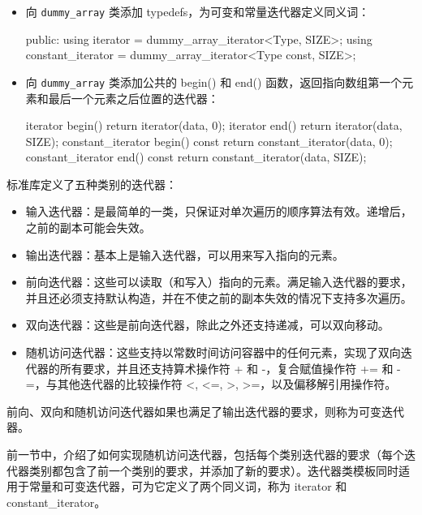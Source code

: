 \begin{itemize}
\item
向 \verb|dummy_array| 类添加 typedefs，为可变和常量迭代器定义同义词：

\begin{cpp}
public:
    using iterator = dummy_array_iterator<Type, SIZE>;
    using constant_iterator = dummy_array_iterator<Type const,
                                                   SIZE>;
\end{cpp}

\item
向 \verb|dummy_array| 类添加公共的 begin() 和 end() 函数，返回指向数组第一个元素和最后一个元素之后位置的迭代器：

\begin{cpp}
iterator begin()
{
    return iterator(data, 0);
}
iterator end()
{
    return iterator(data, SIZE);
}
constant_iterator begin() const
{
    return constant_iterator(data, 0);
}
constant_iterator end() const
{
    return constant_iterator(data, SIZE);
}
\end{cpp}
\end{itemize}


标准库定义了五种类别的迭代器：

\begin{itemize}
\item
输入迭代器：是最简单的一类，只保证对单次遍历的顺序算法有效。递增后，之前的副本可能会失效。

\item
输出迭代器：基本上是输入迭代器，可以用来写入指向的元素。

\item
前向迭代器：这些可以读取（和写入）指向的元素。满足输入迭代器的要求，并且还必须支持默认构造，并在不使之前的副本失效的情况下支持多次遍历。

\item
双向迭代器：这些是前向迭代器，除此之外还支持递减，可以双向移动。

\item
随机访问迭代器：这些支持以常数时间访问容器中的任何元素，实现了双向迭代器的所有要求，并且还支持算术操作符 + 和 -，复合赋值操作符 += 和 -=，与其他迭代器的比较操作符 <, <=, >, >=，以及偏移解引用操作符。
\end{itemize}

前向、双向和随机访问迭代器如果也满足了输出迭代器的要求，则称为可变迭代器。

前一节中，介绍了如何实现随机访问迭代器，包括每个类别迭代器的要求（每个迭代器类别都包含了前一个类别的要求，并添加了新的要求）。迭代器类模板同时适用于常量和可变迭代器，可为它定义了两个同义词，称为 iterator 和 constant\_iterator。

